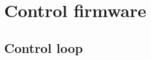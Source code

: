 \documentclass[12pt]{amsart}
\newcommand{\AM}{\mathbf{A}}
\newcommand{\BM}{\mathbf{B}}
\newcommand{\R}{\mathbb{R}}
\begin{document}



\newpage
{}
\section{Control firmware}

\subsection{Control loop}
\end{document}
